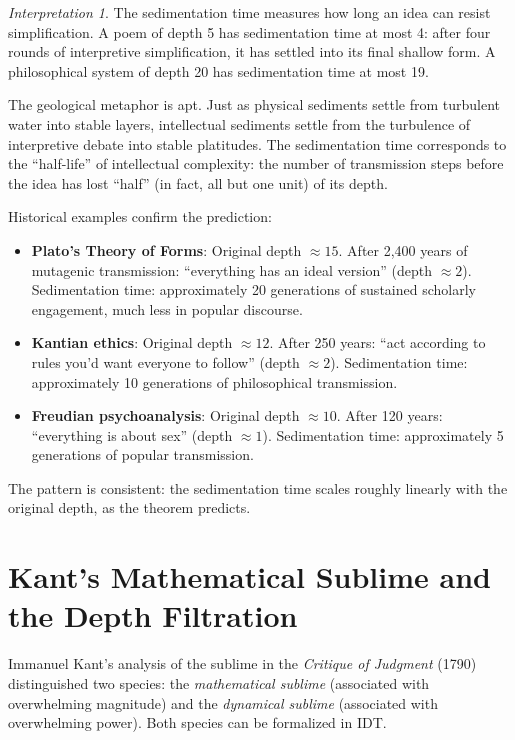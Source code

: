 \documentclass[11pt,openany]{book}
\theoremstyle{definition}
\theoremstyle{plain}
\theoremstyle{remark}
\newtheorem{interpretation}[axiom]{Interpretation}
\begin{document}
\begin{interpretation}
The sedimentation time measures how long an idea can resist simplification. A poem of depth 5 has sedimentation time at most 4: after four rounds of interpretive simplification, it has settled into its final shallow form. A philosophical system of depth 20 has sedimentation time at most 19.

The geological metaphor is apt. Just as physical sediments settle from turbulent water into stable layers, intellectual sediments settle from the turbulence of interpretive debate into stable platitudes. The sedimentation time corresponds to the ``half-life'' of intellectual complexity: the number of transmission steps before the idea has lost ``half'' (in fact, all but one unit) of its depth.

Historical examples confirm the prediction:
\begin{itemize}
\item \textbf{Plato's Theory of Forms}: Original depth $\approx 15$. After 2,400 years of mutagenic transmission: ``everything has an ideal version'' (depth $\approx 2$). Sedimentation time: approximately 20 generations of sustained scholarly engagement, much less in popular discourse.
\item \textbf{Kantian ethics}: Original depth $\approx 12$. After 250 years: ``act according to rules you'd want everyone to follow'' (depth $\approx 2$). Sedimentation time: approximately 10 generations of philosophical transmission.
\item \textbf{Freudian psychoanalysis}: Original depth $\approx 10$. After 120 years: ``everything is about sex'' (depth $\approx 1$). Sedimentation time: approximately 5 generations of popular transmission.
\end{itemize}
The pattern is consistent: the sedimentation time scales roughly linearly with the original depth, as the theorem predicts.
\end{interpretation}

\section{Kant's Mathematical Sublime and the Depth Filtration}

Immanuel Kant's analysis of the sublime in the \emph{Critique of Judgment} (1790) distinguished two species: the \emph{mathematical sublime} (associated with overwhelming magnitude) and the \emph{dynamical sublime} (associated with overwhelming power). Both species can be formalized in IDT.
\end{document}
